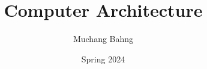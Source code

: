 \documentclass{article}
\begin{document}
\title{Computer Architecture}
\author{Muchang Bahng}
\date{Spring 2024}

\maketitle
\tableofcontents
\pagebreak












\end{document}

